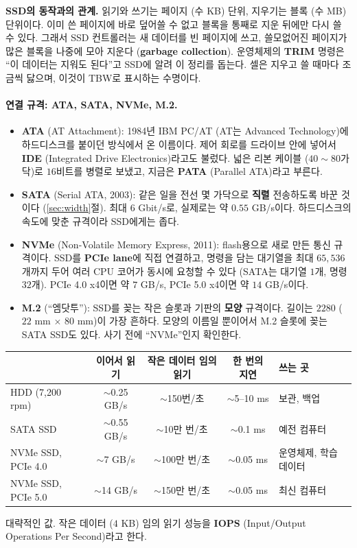 \documentclass[11pt,a4paper]{article}
\begin{document}
\begin{remarkbox}
\medskip
\textbf{SSD의 동작과의 관계.} 읽기와 쓰기는 페이지 (수 KB) 단위, 지우기는 블록 (수 MB) 단위이다.
이미 쓴 페이지에 바로 덮어쓸 수 없고 블록을 통째로 지운 뒤에만 다시 쓸 수 있다.
그래서 SSD 컨트롤러는 새 데이터를 빈 페이지에 쓰고, 쓸모없어진 페이지가 많은 블록을 나중에 모아 지운다 (\textbf{garbage collection}).
운영체제의 \textbf{TRIM} 명령은 ``이 데이터는 지워도 된다''고 SSD에 알려 이 정리를 돕는다.
셀은 지우고 쓸 때마다 조금씩 닳으며, 이것이 TBW로 표시하는 수명이다.
\end{remarkbox}

\paragraph{연결 규격: ATA, SATA, NVMe, M.2.}
\begin{itemize}[leftmargin=1.5em]
\item \textbf{ATA} (AT Attachment): 1984년 IBM PC/AT (AT는 Advanced Technology)에 하드디스크를 붙이던 방식에서 온 이름이다.
제어 회로를 드라이브 안에 넣어서 \textbf{IDE} (Integrated Drive Electronics)라고도 불렀다.
넓은 리본 케이블 ($40\sim80$가닥)로 $16$비트를 병렬로 보냈고, 지금은 \textbf{PATA} (Parallel ATA)라고 부른다.
\item \textbf{SATA} (Serial ATA, 2003): 같은 일을 전선 몇 가닥으로 \textbf{직렬} 전송하도록 바꾼 것이다 (\ref{sec:width}절).
최대 $6$ Gbit/s로, 실제로는 약 $0.55$ GB/s이다. 하드디스크의 속도에 맞춘 규격이라 SSD에게는 좁다.
\item \textbf{NVMe} (Non-Volatile Memory Express, 2011): flash용으로 새로 만든 통신 규격이다. SSD를 \textbf{PCIe lane}에 직접 연결하고,
명령을 담는 대기열을 최대 $65{,}536$개까지 두어 여러 CPU 코어가 동시에 요청할 수 있다 (SATA는 대기열 $1$개, 명령 $32$개).
PCIe 4.0 x4이면 약 $7$ GB/s, PCIe 5.0 x4이면 약 $14$ GB/s이다.
\item \textbf{M.2} (``엠닷투''): SSD를 꽂는 작은 슬롯과 기판의 \textbf{모양} 규격이다. 길이는 $2280$ ($22$ mm $\times$ $80$ mm)이 가장 흔하다.
모양의 이름일 뿐이어서 M.2 슬롯에 꽂는 SATA SSD도 있다. 사기 전에 ``NVMe''인지 확인한다.
\end{itemize}

\begin{center}
{\small
\begin{tabular}{@{}lcccl@{}}
\toprule
& 이어서 읽기 & 작은 데이터 임의 읽기 & 한 번의 지연 & 쓰는 곳 \\
\midrule
HDD (7,200 rpm) & $\sim$0.25 GB/s & $\sim$150번/초 & $\sim$5--10 ms & 보관, 백업 \\
SATA SSD & $\sim$0.55 GB/s & $\sim$10만 번/초 & $\sim$0.1 ms & 예전 컴퓨터 \\
NVMe SSD, PCIe 4.0 & $\sim$7 GB/s & $\sim$100만 번/초 & $\sim$0.05 ms & 운영체제, 학습 데이터 \\
NVMe SSD, PCIe 5.0 & $\sim$14 GB/s & $\sim$150만 번/초 & $\sim$0.05 ms & 최신 컴퓨터 \\
\bottomrule
\end{tabular}}

\small 대략적인 값. 작은 데이터 ($4$ KB) 임의 읽기 성능을 \textbf{IOPS} (Input/Output Operations Per Second)라고 한다.
\end{center}
\end{document}
